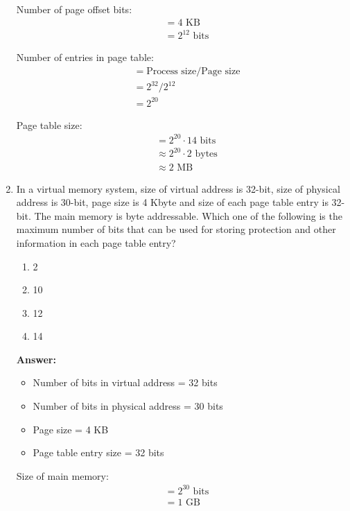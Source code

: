 \documentclass[12pt]{article}
\newcommand{\answeritem}{\global\answertrue\item}
\newcommand{\perhapsanswer}{%
  \ifanswer
    $\blacksquare$ \global\answerfalse
  \else
    $\square$ \global\answerfalse
  \fi
}
\newif\ifanswer
\begin{document}
\begin{enumerate}
  Number of page offset bits:
  \begin{align*}
    &= 4 \text{ KB}\\
    &= 2^{12} \text{ bits}
  \end{align*}

  Number of entries in page table:
  \begin{align*}
    &= \text{Process size} / \text{Page size}\\
    &= 2^{32} / 2^{12}\\
    &= 2^{20}
  \end{align*}
 
  Page table size:
  \begin{align*}
    &= 2^{20} \cdot 14 \text{ bits}\\
    &\approx 2^{20} \cdot 2 \text{ bytes} \\
    &\approx 2 \text{ MB}
  \end{align*}

  \item In a virtual memory system, size of virtual address is 32-bit, size of physical address is 30-bit, page size is 4 Kbyte and size of each page table entry is 32-bit. The main memory is byte addressable. Which one of the following is the maximum number of bits that can be used for storing protection and other information in each page table entry?

  \begin{enumerate}[start=1,align=left,label={\protect\perhapsanswer(\alph*)}]
    \item 2
    \item 10
    \item 12
    \answeritem 14
  \end{enumerate} 

\textbf{Answer:}

  \begin{itemize}
    \item Number of bits in virtual address = 32 bits
    \item Number of bits in physical address = 30 bits
    \item Page size = 4 KB
    \item Page table entry size = 32 bits
  \end{itemize}

  Size of main memory:
  \begin{align*}
    &= 2^{30} \text{ bits} \\
    &= 1 \text{ GB}
  \end{align*}


\end{enumerate}
\end{document}
